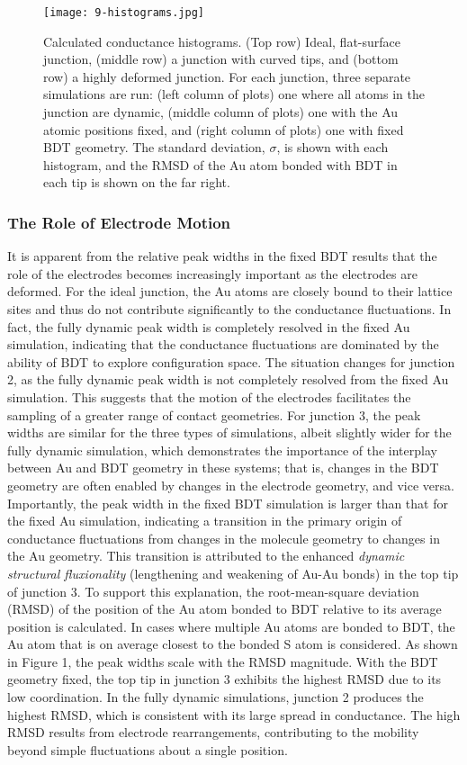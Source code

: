 \documentclass[10pt]{report}  %
\newcommand\findent{\hspace*{\parindent}}
\begin{document}
\begin{figure}[t!]
	\centering
	\texttt{[image: 9-histograms.jpg]}
	\caption{Calculated conductance histograms. (Top row) Ideal, flat-surface junction, (middle row) a junction with curved tips, and (bottom row) a highly deformed junction. For each junction, three separate simulations are run: (left column of plots) one where all atoms in the junction are dynamic, (middle column of plots) one with the Au atomic positions fixed, and (right column of plots) one with fixed BDT geometry. The standard deviation, $\sigma$, is shown with each histogram, and the RMSD of the Au atom bonded with BDT in each tip is shown on the far right. }
	\label{fig:9-histograms}
\end{figure}

\subsubsection{The Role of Electrode Motion}

\findent It is apparent from the relative peak widths in the fixed BDT results that the role of the electrodes becomes increasingly important as the electrodes are deformed. For the ideal junction, the Au atoms are closely bound to their lattice sites and thus do not contribute significantly to the conductance fluctuations. In fact, the fully dynamic peak width is completely resolved in the fixed Au simulation, indicating that the conductance fluctuations are dominated by the ability of BDT to explore configuration space. The situation changes for junction 2, as the fully dynamic peak width is not completely resolved from the fixed Au simulation. This suggests that the motion of the electrodes facilitates the sampling of a greater range of contact geometries. For junction 3, the peak widths are similar for the three types of simulations, albeit slightly wider for the fully dynamic simulation, which demonstrates the importance of the interplay between Au and BDT geometry in these systems; that is, changes in the BDT geometry are often enabled by changes in the electrode geometry, and vice versa. Importantly, the peak width in the fixed BDT simulation is larger than that for the fixed Au simulation, indicating a transition in the primary origin of conductance fluctuations from changes in the molecule geometry to changes in the Au geometry. This transition is attributed to the enhanced \textit{dynamic structural fluxionality} \cite{Rashkeev:2007} (lengthening and weakening of Au-Au bonds) in the top tip of junction 3. To support this explanation, the root-mean-square deviation (RMSD) of the position of the Au atom bonded to BDT relative to its average position is calculated. In cases where multiple Au atoms are bonded to BDT, the Au atom that is on average closest to the bonded S atom is considered. As shown in Figure 1, the peak widths scale with the RMSD magnitude. With the BDT geometry fixed, the top tip in junction 3 exhibits the highest RMSD due to its low coordination. In the fully dynamic simulations, junction 2 produces the highest RMSD, which is consistent with its large spread in conductance. The high RMSD results from electrode rearrangements, contributing to the mobility beyond simple fluctuations about a single position. 
\end{document}
